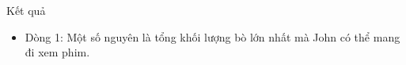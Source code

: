 Kết quả
\begin{itemize}
	\item     Dòng 1: Một số nguyên là tổng khối lượng bò lớn nhất mà John        có thể mang đi xem phim.   
\end{itemize}